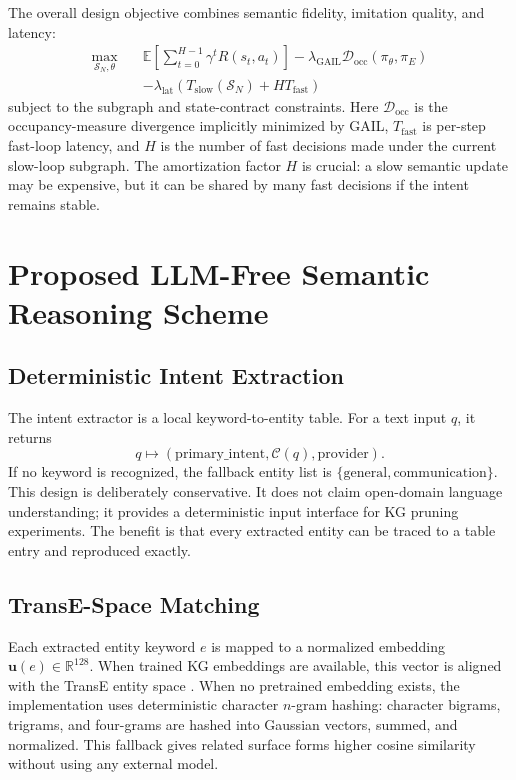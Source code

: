 \documentclass[journal]{IEEEtran}
\newcommand{\SG}{\mathcal{S}}
\newcommand{\calC}{\mathcal{C}}
\newcommand{\bbE}{\mathbb{E}}
\newcommand{\R}{\mathbb{R}}
\begin{document}
The overall design objective combines semantic fidelity, imitation quality, and latency:
\begin{align}
\max_{\SG_N,\theta}\quad
& \bbE\left[\sum_{t=0}^{H-1}\gamma^t R(s_t,a_t)\right]
-\lambda_{\mathrm{GAIL}}\mathcal{D}_{\mathrm{occ}}(\pi_\theta,\pi_E) \nonumber\\
&-\lambda_{\mathrm{lat}}
\left(T_{\mathrm{slow}}(\SG_N)+H T_{\mathrm{fast}}\right)
\label{eq:overall_obj}
\end{align}
subject to the subgraph and state-contract constraints. Here $\mathcal{D}_{\mathrm{occ}}$ is the occupancy-measure divergence implicitly minimized by GAIL, $T_{\mathrm{fast}}$ is per-step fast-loop latency, and $H$ is the number of fast decisions made under the current slow-loop subgraph. The amortization factor $H$ is crucial: a slow semantic update may be expensive, but it can be shared by many fast decisions if the intent remains stable.

\section{Proposed LLM-Free Semantic Reasoning Scheme}

\subsection{Deterministic Intent Extraction}

The intent extractor is a local keyword-to-entity table. For a text input $q$, it returns
\begin{equation}
q \mapsto
\left(\mathrm{primary\_intent},\calC(q),\mathrm{provider}\right).
\end{equation}
If no keyword is recognized, the fallback entity list is $\{\mathrm{general},\mathrm{communication}\}$. This design is deliberately conservative. It does not claim open-domain language understanding; it provides a deterministic input interface for KG pruning experiments. The benefit is that every extracted entity can be traced to a table entry and reproduced exactly.

\subsection{TransE-Space Matching}

Each extracted entity keyword $e$ is mapped to a normalized embedding $\mathbf{u}(e)\in\R^{128}$. When trained KG embeddings are available, this vector is aligned with the TransE entity space \cite{bordes2013translating,xie2016transe}. When no pretrained embedding exists, the implementation uses deterministic character $n$-gram hashing: character bigrams, trigrams, and four-grams are hashed into Gaussian vectors, summed, and normalized. This fallback gives related surface forms higher cosine similarity without using any external model.
\end{document}
